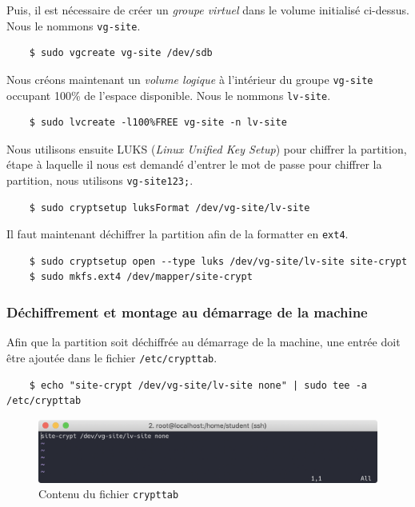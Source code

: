 \documentclass{extarticle} %
\begin{document}
    Puis, il est nécessaire de créer un \textit{groupe virtuel} dans le volume initialisé ci-dessus. Nous le nommons \texttt{vg-site}.

    \begin{verbatim}
    $ sudo vgcreate vg-site /dev/sdb
    \end{verbatim}

    Nous créons maintenant un \textit{volume logique} à l'intérieur du groupe \texttt{vg-site} occupant 100\% de l'espace disponible. Nous le nommons \texttt{lv-site}.

    \begin{verbatim}
    $ sudo lvcreate -l100%FREE vg-site -n lv-site
    \end{verbatim}

    Nous utilisons ensuite LUKS (\textit{Linux Unified Key Setup}) pour chiffrer la partition, étape à laquelle il nous est
    demandé d'entrer le mot de passe pour chiffrer la partition, nous utilisons \texttt{vg-site123;}.

    \begin{verbatim}
    $ sudo cryptsetup luksFormat /dev/vg-site/lv-site
    \end{verbatim}

    Il faut maintenant déchiffrer la partition afin de la formatter en \texttt{ext4}.

    \begin{verbatim}
    $ sudo cryptsetup open --type luks /dev/vg-site/lv-site site-crypt
    $ sudo mkfs.ext4 /dev/mapper/site-crypt
    \end{verbatim}

    \subsubsection{Déchiffrement et montage au démarrage de la machine}

    Afin que la partition soit déchiffrée au démarrage de la machine, une entrée doit être ajoutée dans le fichier \texttt{/etc/crypttab}.

    \begin{verbatim}
    $ echo "site-crypt /dev/vg-site/lv-site none" | sudo tee -a /etc/crypttab
    \end{verbatim}

    \begin{figure}[H]
      \centering
      \includegraphics[scale=0.6]{img/crypttab.png}
      \caption{Contenu du fichier \texttt{crypttab}}
    \end{figure}
\end{document}
